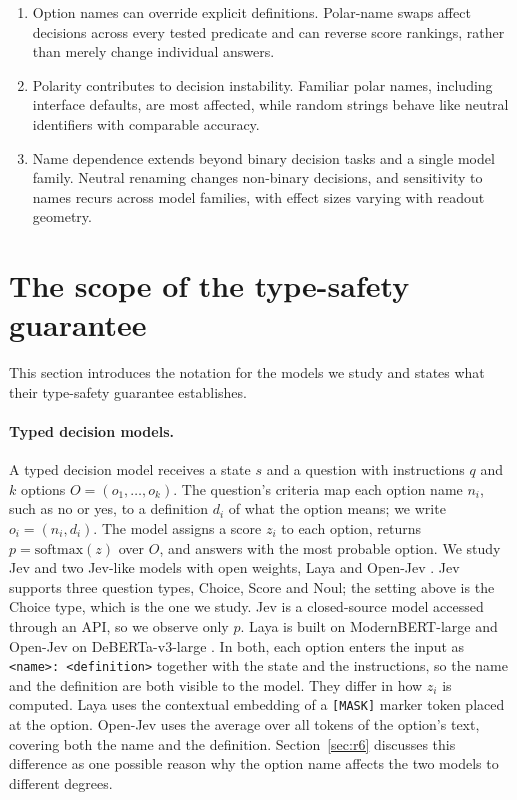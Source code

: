 \documentclass[11pt]{article}
\newcommand{\opt}[1]{\textsf{#1}}          %
\begin{document}
\begin{enumerate}
\item Option names can override explicit definitions.
Polar-name swaps affect decisions across every tested predicate and can reverse score rankings, rather than merely change individual answers.

\item Polarity contributes to decision instability.
Familiar polar names, including interface defaults, are most affected, while random strings behave like neutral identifiers with comparable accuracy.

\item Name dependence extends beyond binary decision tasks and a single model family.
Neutral renaming changes non-binary decisions, and sensitivity to names recurs across model families, with effect sizes varying with readout geometry.
\end{enumerate}




\section{The scope of the type-safety guarantee}
\label{sec:lemma}

This section introduces the notation for the models we study and states what their type-safety
guarantee establishes.

\paragraph{Typed decision models.} A typed decision model receives a state $s$ and a question with
instructions $q$ and $k$ options $O=(o_1,\dots,o_k)$. The question's criteria map each option name
$n_i$, such as \opt{no} or \opt{yes}, to a definition $d_i$ of what the option means; we write
$o_i=(n_i,d_i)$. The model assigns a score $z_i$ to each option, returns
$p=\mathrm{softmax}(z)$ over $O$, and answers with the most probable option. We study Jev
\citep{typesafe} and two Jev-like models with open weights, Laya \citep{convai2026laya} and
Open-Jev \citep{kotoba2026openjev}. Jev supports three question types, Choice, Score and Noul; the
setting above is the Choice type, which is the one we study. Jev is a closed-source model accessed
through an API, so we observe only $p$. Laya is built on ModernBERT-large
\citep{warner2024modernbert} and Open-Jev on DeBERTa-v3-large \citep{he2023debertav3}. In both,
each option enters the input as \texttt{<name>: <definition>} together with the state and the
instructions, so the name and the definition are both visible to the model. They differ in how
$z_i$ is computed. Laya uses the contextual embedding of a \texttt{[MASK]} marker token placed at
the option. Open-Jev uses the average over all tokens of the option's text, covering both the name
and the definition. Section~\ref{sec:r6} discusses this difference as one possible reason why the
option name affects the two models to different degrees.
\end{document}
